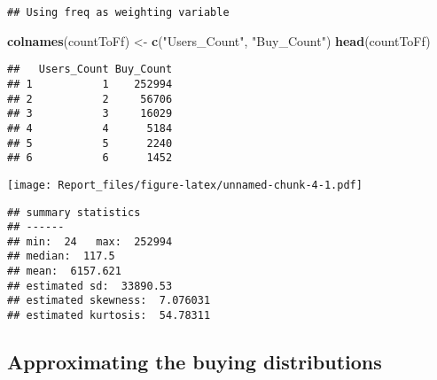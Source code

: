 \documentclass[]{article}
\newenvironment{Shaded}{\begin{snugshade}}{\end{snugshade}}
\newcommand{\KeywordTok}[1]{\textcolor[rgb]{0.13,0.29,0.53}{\textbf{#1}}}
\newcommand{\DataTypeTok}[1]{\textcolor[rgb]{0.13,0.29,0.53}{#1}}
\newcommand{\DecValTok}[1]{\textcolor[rgb]{0.00,0.00,0.81}{#1}}
\newcommand{\StringTok}[1]{\textcolor[rgb]{0.31,0.60,0.02}{#1}}
\newcommand{\OperatorTok}[1]{\textcolor[rgb]{0.81,0.36,0.00}{\textbf{#1}}}
\newcommand{\NormalTok}[1]{#1}
\begin{document}
\begin{verbatim}
## Using freq as weighting variable
\end{verbatim}

\begin{Shaded}
\begin{Highlighting}[]
\KeywordTok{colnames}\NormalTok{(countToFf) <-}\StringTok{ }\KeywordTok{c}\NormalTok{(}\StringTok{"Users_Count"}\NormalTok{, }\StringTok{"Buy_Count"}\NormalTok{)}
\KeywordTok{head}\NormalTok{(countToFf)}
\end{Highlighting}
\end{Shaded}

\begin{verbatim}
##   Users_Count Buy_Count
## 1           1    252994
## 2           2     56706
## 3           3     16029
## 4           4      5184
## 5           5      2240
## 6           6      1452
\end{verbatim}

\begin{Shaded}
\end{Shaded}

\texttt{[image: Report\_files/figure-latex/unnamed-chunk-4-1.pdf]}

\begin{verbatim}
## summary statistics
## ------
## min:  24   max:  252994 
## median:  117.5 
## mean:  6157.621 
## estimated sd:  33890.53 
## estimated skewness:  7.076031 
## estimated kurtosis:  54.78311
\end{verbatim}

\subsection{Approximating the buying
distributions}\label{approximating-the-buying-distributions}

\begin{Shaded}
\end{Shaded}
\end{document}
